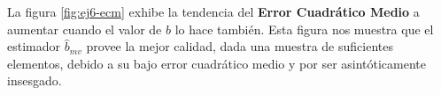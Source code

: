 La figura \ref{fig:ej6-ecm} exhibe la tendencia del \textbf{Error Cuadrático Medio} a aumentar cuando el valor de $b$ lo hace también. Esta figura nos muestra que el estimador $\hat{b}_{mv}$ provee la mejor calidad, dada una muestra de suficientes elementos, debido a su bajo error cuadrático medio y por ser asintóticamente insesgado.
